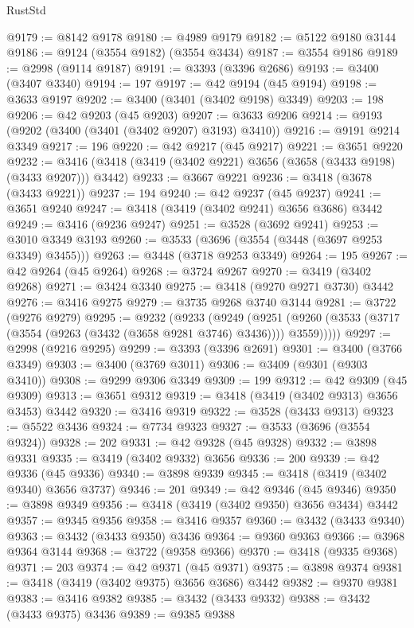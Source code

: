 \begin{lexlean}{RustStd}
\begin{coremodule}
@9179 := @8142 @9178
@9180 := @4989 @9179
@9182 := @5122 @9180 @3144
@9186 := @9124 (@3554 @9182) (@3554 @3434)
@9187 := @3554 @9186
@9189 := @2998 (@9114 @9187)
@9191 := @3393 (@3396 @2686)
@9193 := @3400 (@3407 @3340)
@9194 := 197
@9197 := @42 @9194 (@45 @9194)
@9198 := @3633 @9197
@9202 := @3400 (@3401 (@3402 @9198) @3349)
@9203 := 198
@9206 := @42 @9203 (@45 @9203)
@9207 := @3633 @9206
@9214 := @9193 (@9202 (@3400 (@3401 (@3402 @9207) @3193) @3410))
@9216 := @9191 @9214 @3349
@9217 := 196
@9220 := @42 @9217 (@45 @9217)
@9221 := @3651 @9220
@9232 := @3416 (@3418 (@3419 (@3402 @9221) @3656 (@3658 (@3433 @9198) (@3433 @9207))) @3442)
@9233 := @3667 @9221
@9236 := @3418 (@3678 (@3433 @9221))
@9237 := 194
@9240 := @42 @9237 (@45 @9237)
@9241 := @3651 @9240
@9247 := @3418 (@3419 (@3402 @9241) @3656 @3686) @3442
@9249 := @3416 (@9236 @9247)
@9251 := @3528 (@3692 @9241)
@9253 := @3010 @3349 @3193
@9260 := @3533 (@3696 (@3554 (@3448 (@3697 @9253 @3349) @3455)))
@9263 := @3448 (@3718 @9253 @3349)
@9264 := 195
@9267 := @42 @9264 (@45 @9264)
@9268 := @3724 @9267
@9270 := @3419 (@3402 @9268)
@9271 := @3424 @3340
@9275 := @3418 (@9270 @9271 @3730) @3442
@9276 := @3416 @9275
@9279 := @3735 @9268 @3740 @3144
@9281 := @3722 (@9276 @9279)
@9295 := @9232
    (@9233
      (@9249
        (@9251 (@9260 (@3533 (@3717 (@3554 (@9263 (@3432 (@3658 @9281 @3746) @3436)))) @3559)))))
@9297 := @2998 (@9216 @9295)
@9299 := @3393 (@3396 @2691)
@9301 := @3400 (@3766 @3349)
@9303 := @3400 (@3769 @3011)
@9306 := @3409 (@9301 (@9303 @3410))
@9308 := @9299 @9306 @3349
@9309 := 199
@9312 := @42 @9309 (@45 @9309)
@9313 := @3651 @9312
@9319 := @3418 (@3419 (@3402 @9313) @3656 @3453) @3442
@9320 := @3416 @9319
@9322 := @3528 (@3433 @9313)
@9323 := @5522 @3436
@9324 := @7734 @9323
@9327 := @3533 (@3696 (@3554 @9324))
@9328 := 202
@9331 := @42 @9328 (@45 @9328)
@9332 := @3898 @9331
@9335 := @3419 (@3402 @9332) @3656
@9336 := 200
@9339 := @42 @9336 (@45 @9336)
@9340 := @3898 @9339
@9345 := @3418 (@3419 (@3402 @9340) @3656 @3737)
@9346 := 201
@9349 := @42 @9346 (@45 @9346)
@9350 := @3898 @9349
@9356 := @3418 (@3419 (@3402 @9350) @3656 @3434) @3442
@9357 := @9345 @9356
@9358 := @3416 @9357
@9360 := @3432 (@3433 @9340)
@9363 := @3432 (@3433 @9350) @3436
@9364 := @9360 @9363
@9366 := @3968 @9364 @3144
@9368 := @3722 (@9358 @9366)
@9370 := @3418 (@9335 @9368)
@9371 := 203
@9374 := @42 @9371 (@45 @9371)
@9375 := @3898 @9374
@9381 := @3418 (@3419 (@3402 @9375) @3656 @3686) @3442
@9382 := @9370 @9381
@9383 := @3416 @9382
@9385 := @3432 (@3433 @9332)
@9388 := @3432 (@3433 @9375) @3436
@9389 := @9385 @9388

\end{coremodule}
\end{lexlean}
